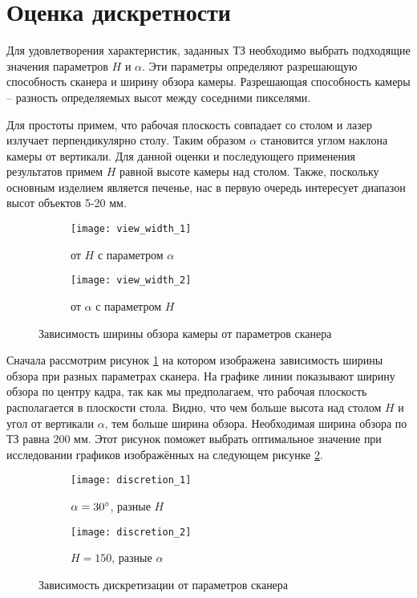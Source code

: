     \section{Оценка дискретности}\label{sec:error}
        Для удовлетворения характеристик, заданных ТЗ необходимо выбрать подходящие значения параметров $ H $ и $\alpha$. Эти параметры определяют разрешающую способность сканера и ширину обзора камеры. Разрешающая способность камеры -- разность определяемых высот между соседними пикселями.
        
        Для простоты примем, что рабочая плоскость совпадает со столом и лазер излучает перпендикулярно столу. Таким образом $\alpha$ становится углом наклона камеры от вертикали. Для данной оценки и последующего применения результатов примем $ H $ равной высоте камеры над столом. Также, поскольку основным изделием является печенье, нас в первую очередь интересует диапазон высот объектов 5-20 мм.
        \begin{figure}[H]
            \centering
            \begin{subfigure}{\linewidth}
                \centering
                \texttt{[image: view\_width\_1]}
                \caption{от $ H $ с параметром $ \alpha $}
            \end{subfigure}
            \begin{subfigure}{\linewidth}
                \centering
                \texttt{[image: view\_width\_2]}
                \caption{от $ \alpha $ с параметром $ H $}
            \end{subfigure}
            \caption{Зависимость ширины обзора камеры от параметров сканера}
            \label{pic:view_width}
        \end{figure}
        Сначала рассмотрим рисунок \ref{pic:view_width} на котором изображена зависимость ширины обзора при разных параметрах сканера. На графике линии показывают ширину обзора по центру кадра, так как мы предполагаем, что рабочая плоскость располагается в плоскости стола. Видно, что чем больше высота над столом $ H $ и угол от вертикали $ \alpha $, тем больше ширина обзора. Необходимая ширина обзора по ТЗ равна 200 мм. Этот рисунок поможет выбрать оптимальное значение при исследовании графиков изображённых на следующем рисунке \ref{pic:discretion}.
        \begin{figure}[H]
            \centering
            \begin{subfigure}{\linewidth}
                \centering
                \texttt{[image: discretion\_1]}
                \caption{$ \alpha = 30^{\circ} $, разные $ H $}
            \end{subfigure}
            \begin{subfigure}{\linewidth}
                \centering
                \texttt{[image: discretion\_2]}
                \caption{$ H = 150 $, разные $ \alpha $}
            \end{subfigure}
            \caption{Зависимость дискретизации от параметров сканера}
            \label{pic:discretion}
        \end{figure}
